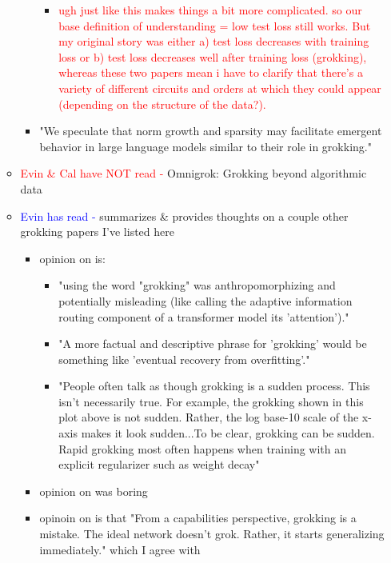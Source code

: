 \documentclass{article}
\begin{document}
\begin{itemize}
\begin{itemize}
\begin{itemize}
            \begin{itemize}
                \item \textcolor{red}{ugh just like \cite{arpit2017closer} this makes things a bit more complicated. so our base definition of understanding = low test loss still works. But my original story was either a) test loss decreases with training loss or b) test loss decreases well after training loss (grokking), whereas these two papers mean i have to clarify that there's a variety of different circuits and orders at which they could appear (depending on the structure of the data?).}
            \end{itemize}
            \item "We speculate that norm growth and sparsity may facilitate emergent behavior in large language models similar to their role in grokking."
        \end{itemize}
        \item \textcolor{red}{Evin \& Cal have NOT read - } \cite{liu2022omnigrok} Omnigrok: Grokking beyond algorithmic data
        \item \textcolor{blue}{Evin has read -} \cite{pope2023grok} summarizes \& provides thoughts on a couple other grokking papers I've listed here
        \begin{itemize}
            \item opinion on \cite{power2022grokking} is:
            \begin{itemize}
                \item "using the word "grokking" was anthropomorphizing and potentially misleading (like calling the adaptive information routing component of a transformer model its 'attention')."
                \item "A more factual and descriptive phrase for 'grokking' would be something like 'eventual recovery from overfitting'."
                \item "People often talk as though grokking is a sudden process. This isn't necessarily true. For example, the grokking shown in this plot above is not sudden. Rather, the log base-10 scale of the x-axis makes it look sudden...To be clear, grokking can be sudden. Rapid grokking most often happens when training with an explicit regularizer such as weight decay"
            \end{itemize}
            \item opinion on \cite{nanda2023progress} was boring
            \item opinoin on \cite{liu2022towards} is that "From a capabilities perspective, grokking is a mistake. The ideal network doesn't grok. Rather, it starts generalizing immediately." which I agree with

\end{itemize}
\end{itemize}
\end{itemize}
\end{document}

